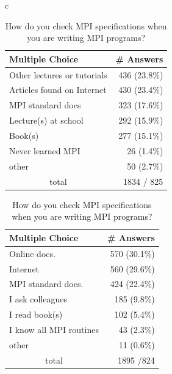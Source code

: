 \documentclass[sigconf,nonacm]{acmart}
\begin{document}
\begin{table}[htb]%
\scriptsize
\begin{center}%
\begin{tabular}[t]{c}

\begin{minipage}{0.24\hsize}
\begin{center}%
\caption{\small How did you learn MPI?}%
\label{tab:Q10-ans}%
\begin{tabular}[t]{l|r}%
\hline%
Multiple Choice & \# Answers \\%
\hline%
Other lectures or tutorials & 436 (23.8\%) \\%
Articles found on Internet & 430 (23.4\%) \\%
MPI standard docs & 323 (17.6\%) \\%
Lecture(s) at school & 292 (15.9\%) \\%
Book(s) & 277 (15.1\%) \\%
Never learned MPI & 26 (1.4\%) \\%
other & 50 (2.7\%) \\%
\hline%
\multicolumn{1}{c}{total} & 1834 / 825 \\%
\hline%
\end{tabular}%
\end{center}%
\end{minipage}

\hspace{1mm}
\begin{minipage}{0.24\hsize}
\begin{center}%
\caption{\footnotesize How do you check MPI specifications when you are writing MPI programs?}%
\label{tab:Q14-ans}%
\begin{tabular}[t]{l|r}%
\hline%
Multiple Choice & \# Answers \\%
\hline%
Online docs. & 570 (30.1\%) \\%
Internet & 560 (29.6\%) \\%
MPI standard docs. & 424 (22.4\%) \\%
I ask colleagues & 185 (9.8\%) \\%
I read book(s) & 102 (5.4\%) \\%
I know all MPI routines & 43 (2.3\%) \\%
other & 11 (0.6\%) \\%
\hline%
\multicolumn{1}{c}{total} & 1895 /824 \\%
\hline%
\end{tabular}%
\end{center}%
\end{minipage}


\end{tabular}
\end{center}
\end{table}
\end{document}
